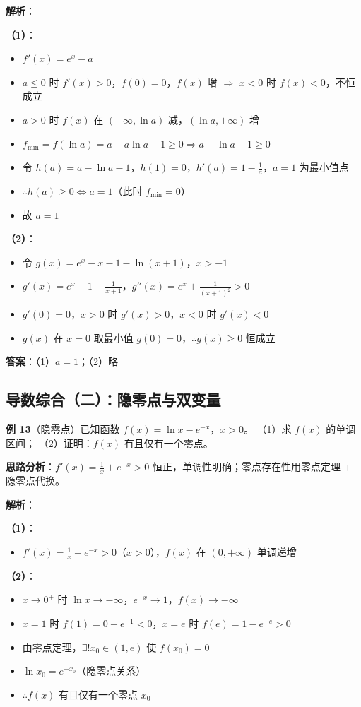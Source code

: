 \textbf{解析}：

\textbf{（1）}：
\begin{itemize}
  \item $f'(x)=e^x-a$
  \item $a\le0$ 时 $f'(x)>0$，$f(0)=0$，$f(x)$ 增 $\Rightarrow$ $x<0$ 时 $f(x)<0$，不恒成立
  \item $a>0$ 时 $f(x)$ 在 $(-\infty,\ln a)$ 减，$(\ln a,+\infty)$ 增
  \item $f_{\min}=f(\ln a)=a-a\ln a-1\ge0 \Rightarrow a-\ln a-1\ge0$
  \item 令 $h(a)=a-\ln a-1$，$h(1)=0$，$h'(a)=1-\frac1a$，$a=1$ 为最小值点
  \item $\therefore h(a)\ge0 \iff a=1$（此时 $f_{\min}=0$）
  \item 故 $a=1$
\end{itemize}

\textbf{（2）}：
\begin{itemize}
  \item 令 $g(x)=e^x-x-1-\ln(x+1)$，$x>-1$
  \item $g'(x)=e^x-1-\frac1{x+1}$，$g''(x)=e^x+\frac1{(x+1)^2}>0$
  \item $g'(0)=0$，$x>0$ 时 $g'(x)>0$，$x<0$ 时 $g'(x)<0$
  \item $g(x)$ 在 $x=0$ 取最小值 $g(0)=0$，$\therefore g(x)\ge0$ 恒成立
\end{itemize}

\textbf{答案}：（1）$a=1$；（2）略

\subsection{导数综合（二）：隐零点与双变量}

\textbf{例 13}（隐零点）已知函数 $f(x)=\ln x - e^{-x}$，$x>0$。
（1）求 $f(x)$ 的单调区间；
（2）证明：$f(x)$ 有且仅有一个零点。

\textbf{思路分析}：$f'(x)=\frac1x+e^{-x}>0$ 恒正，单调性明确；零点存在性用零点定理 + 隐零点代换。

\textbf{解析}：

\textbf{（1）}：
\begin{itemize}
  \item $f'(x)=\frac1x+e^{-x}>0$（$x>0$），$f(x)$ 在 $(0,+\infty)$ 单调递增
\end{itemize}

\textbf{（2）}：
\begin{itemize}
  \item $x\to0^+$ 时 $\ln x\to-\infty$，$e^{-x}\to1$，$f(x)\to-\infty$
  \item $x=1$ 时 $f(1)=0-e^{-1}<0$，$x=e$ 时 $f(e)=1-e^{-e}>0$
  \item 由零点定理，$\exists!x_0\in(1,e)$ 使 $f(x_0)=0$
  \item $\ln x_0 = e^{-x_0}$（隐零点关系）
  \item $\therefore f(x)$ 有且仅有一个零点 $x_0$
\end{itemize}

